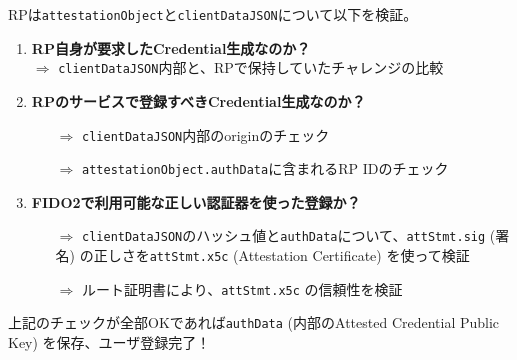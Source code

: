 \documentclass[12pt,dvipdfmx,uplatex]{beamer}
\begin{document}
\begin{frame}
\small
RPは\texttt{attestationObject}と\texttt{clientDataJSON}について以下を検証。

\begin{enumerate}
 \item \textbf{RP自身が要求したCredential生成なのか？}\\
$\Rightarrow$ \texttt{clientDataJSON}内部と、RPで保持していたチャレンジの比較
 \item \textbf{RPのサービスで登録すべきCredential生成なのか？}\\
\begin{itemize}
 \item[$\Rightarrow$] \texttt{clientDataJSON}内部のoriginのチェック
 \item[$\Rightarrow$] \texttt{attestationObject.authData}に含まれるRP IDのチェック
\end{itemize}
 \item \textbf{FIDO2で利用可能な正しい認証器を使った登録か？}\\
\begin{itemize}
 \item[$\Rightarrow$] \alert{\texttt{clientDataJSON}のハッシュ値と\texttt{authData}について、\texttt{attStmt.sig} (署名) の正しさを\texttt{attStmt.x5c} (Attestation Certificate) を使って検証}
 \item[$\Rightarrow$] \alert{ルート証明書により、\texttt{attStmt.x5c} の信頼性を検証}
\end{itemize}

\end{enumerate}
上記のチェックが全部OKであれば\texttt{authData} (内部のAttested Credential Public Key) を保存、ユーザ登録完了！
\end{frame}
\end{document}
